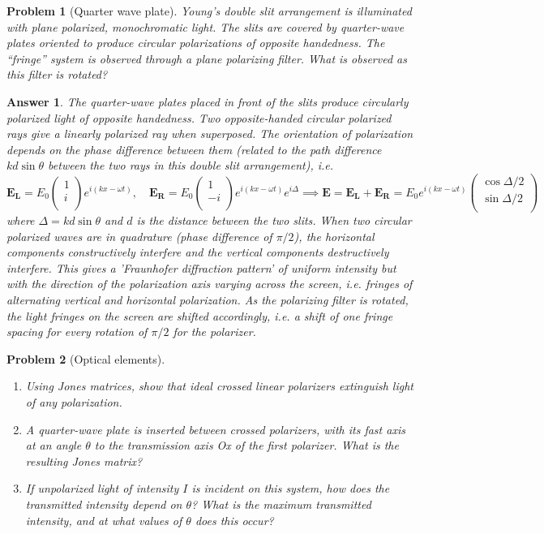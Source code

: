 \documentclass[a4paper]{article}
\newtheorem{ans}{Answer}
\theoremstyle{new}
\newtheorem{qns}{Problem}
\begin{document}
\begin{qns}[Quarter wave plate]
Young’s double slit arrangement is illuminated with plane polarized, monochromatic light. The slits are covered by quarter-wave plates oriented to produce circular polarizations of opposite handedness. The “fringe” system is observed through a plane polarizing filter. What is observed as this filter is rotated?
\end{qns}
\begin{ans}
The quarter-wave plates placed in front of the slits produce circularly polarized light of opposite handedness. Two opposite-handed circular polarized rays give a linearly polarized ray when superposed. The orientation of polarization depends on the phase difference between them (related to the path difference $kd\sin\theta$ between the two rays in this double slit arrangement), i.e.
$$\mathbf{E_L}=E_0\begin{pmatrix}1\\i\\\end{pmatrix}e^{i(kx-\omega t)},\quad\mathbf{E_R}=E_0\begin{pmatrix}1\\-i\\\end{pmatrix}e^{i(kx-\omega t)}e^{i\Delta }\implies\mathbf{E}=\mathbf{E_L}+\mathbf{E_R}=E_0e^{i(kx-\omega t)}\begin{pmatrix}\cos\Delta /2\\\sin \Delta/2\\\end{pmatrix}$$
where $\Delta=kd\sin\theta$ and $d$ is the distance between the two slits. When two circular polarized waves are in quadrature (phase difference of $\pi/2$), the horizontal components constructively interfere and the vertical components destructively interfere. This gives a 'Fraunhofer diffraction pattern' of uniform intensity but with the direction of the polarization axis varying across the screen, i.e. fringes of alternating vertical and horizontal polarization. As the polarizing filter is rotated, the light fringes on the screen are shifted accordingly, i.e. a shift of one fringe spacing for every rotation of $\pi/2$ for the polarizer.
\end{ans}
\newpage
\begin{qns}[Optical elements]\leavevmode
\begin{enumerate}[label=(\alph*)]
\item Using Jones matrices, show that ideal crossed linear polarizers extinguish light of any polarization.
\item A quarter-wave plate is inserted between crossed polarizers, with its fast axis at an angle $\theta$ to the transmission axis Ox of the first polarizer. What is the resulting Jones matrix?
\item If unpolarized light of intensity $I$ is incident on this system, how does the transmitted intensity depend on $\theta$? What is the maximum transmitted intensity, and at what values of $\theta$ does this occur?
\end{enumerate}
\end{qns}
\end{document}
